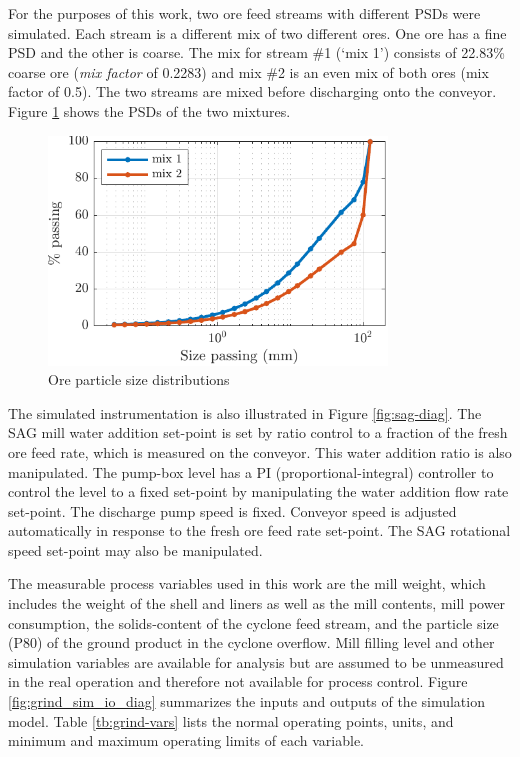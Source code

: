 For the purposes of this work, two ore feed streams with different PSDs were simulated. Each stream is a different mix of two different ores. One ore has a fine PSD and the other is coarse. The mix for stream \#1 (`mix 1') consists of 22.83\% coarse ore (\textit{mix factor} of 0.2283) and mix \#2 is an even mix of both ores (mix factor of 0.5). The two streams are mixed before discharging onto the conveyor. Figure \ref{fig:coarse_fine_psd_plot} shows the PSDs of the two mixtures.

\begin{figure}[htp]
	\centering
	\includegraphics[width=9cm]{images/coarse_fine_cumpsd_plot.pdf}
	\caption{Ore particle size distributions}
	\label{fig:coarse_fine_psd_plot}
\end{figure}

The simulated instrumentation is also illustrated in Figure \ref{fig:sag-diag}. The SAG mill water addition set-point is set by ratio control to a fraction of the fresh ore feed rate, which is measured on the conveyor. This water addition ratio is also manipulated. The pump-box level has a PI (proportional-integral) controller to control the level to a fixed set-point by manipulating the water addition flow rate set-point. The discharge pump speed is fixed. Conveyor speed is adjusted automatically in response to the fresh ore feed rate set-point. The SAG rotational speed set-point may also be manipulated.

The measurable process variables used in this work are the mill weight, which includes the weight of the shell and liners as well as the mill contents, mill power consumption, the solids-content of the cyclone feed stream, and the particle size (P80) of the ground product in the cyclone overflow. Mill filling level and other simulation variables are available for analysis but are assumed to be unmeasured in the real operation and therefore not available for process control.  Figure \ref{fig:grind_sim_io_diag} summarizes the inputs and outputs of the simulation model. Table \ref{tb:grind-vars} lists the normal operating points, units, and minimum and maximum operating limits of each variable.

